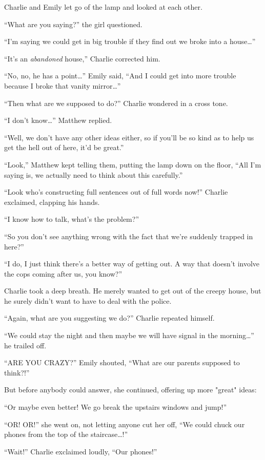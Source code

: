 Charlie and Emily let go of the lamp and looked at each other.

“What are you saying?” the girl questioned.

“I'm saying we could get in big trouble if they find out we broke into a house…”

“It's an \textit{abandoned} house,” Charlie corrected him.

“No, no, he has a point…” Emily said, “And I could get into more trouble because I broke that vanity mirror…”

“Then what are we supposed to do?” Charlie wondered in a cross tone.

“I don't know…” Matthew replied.

“Well, we don't have any other ideas either, so if you'll be so kind as to help us get the hell out of here, it'd be great.”

“Look,” Matthew kept telling them, putting the lamp down on the floor, “All I'm saying is, we actually need to think about this carefully.”

“Look who's constructing full sentences out of full words now!” Charlie exclaimed, clapping his hands.

“I know how to talk, what's the problem?”

“So you don't see anything wrong with the fact that we're suddenly trapped in here?”

“I do, I just think there's a better way of getting out. A way that doesn't involve the cops coming after us, you know?”

Charlie took a deep breath. He merely wanted to get out of the creepy house, but he surely didn't want to have to deal with the police.

“Again, what are you suggesting we do?” Charlie repeated himself.

“We could stay the night and then maybe we will have signal in the morning…” he trailed off.

“ARE YOU CRAZY?” Emily shouted, “What are our parents supposed to think?!”

But before anybody could answer, she continued, offering up more "great" ideas:

“Or maybe even better! We go break the upstairs windows and jump!”

“OR! OR!” she went on, not letting anyone cut her off, “We could chuck our phones from the top of the staircase…!”

“Wait!” Charlie exclaimed loudly, “Our phones!”

